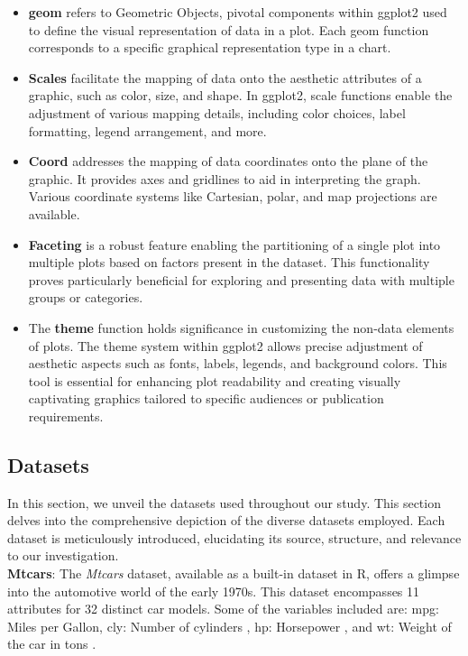 \documentclass{article}\usepackage[]{graphicx}\usepackage[]{xcolor}
\begin{document}
\begin{itemize}
  \item \textbf{geom} refers to Geometric Objects, pivotal components within ggplot2 used to define the visual representation of data in a plot. Each geom function corresponds to a specific graphical representation type in a chart.
  
  \item \textbf{Scales} facilitate the mapping of data onto the aesthetic attributes of a graphic, such as color, size, and shape. In ggplot2, scale functions enable the adjustment of various mapping details, including color choices, label formatting, legend arrangement, and more.
  
  \item \textbf{Coord} addresses the mapping of data coordinates onto the plane of the graphic. It provides axes and gridlines to aid in interpreting the graph. Various coordinate systems like Cartesian, polar, and map projections are available.
  
  \item \textbf{Faceting} is a robust feature enabling the partitioning of a single plot into multiple plots based on factors present in the dataset. This functionality proves particularly beneficial for exploring and presenting data with multiple groups or categories.
  
  \item The \textbf{theme} function holds significance in customizing the non-data elements of plots. The theme system within ggplot2 allows precise adjustment of aesthetic aspects such as fonts, labels, legends, and background colors. This tool is essential for enhancing plot readability and creating visually captivating graphics tailored to specific audiences or publication requirements.
\end{itemize}


\subsection{Datasets}
In this section, we unveil the datasets used throughout our study. This section delves into the comprehensive depiction of the diverse datasets employed. Each dataset is meticulously introduced, elucidating its source, structure, and relevance to our investigation.\\

\noindent
\textbf{Mtcars}: The \textit{Mtcars} dataset, available as a built-in dataset in R, offers a glimpse into the automotive world of the early 1970s. This dataset encompasses 11 attributes for 32 distinct car models. Some of the variables included are: mpg: Miles per Gallon, cly: Number of cylinders , hp: Horsepower , and wt: Weight of the car in tons .\\
\end{document}
